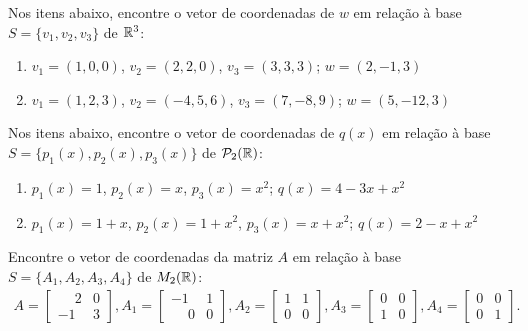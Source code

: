 \documentclass[12pt]{exam}
\begin{document}
    \begin{exercicio}
        Nos itens abaixo, encontre o vetor de coordenadas de $w$ em relação à base $S = \{v_1, v_2, v_3\}$ de $\mathbb{R}^3$:
        \begin{enumerate}[label={\alph*})]
            \item $v_1 = (1, 0, 0)$, $v_2 = (2, 2, 0)$, $v_3 = (3, 3, 3)$; $w = (2, -1, 3)$
            \item $v_1 = (1, 2, 3)$, $v_2 = (-4, 5, 6)$, $v_3 = (7, -8, 9)$; $w = (5, -12, 3)$
        \end{enumerate}
    \end{exercicio}

    \begin{exercicio}
        Nos itens abaixo, encontre o vetor de coordenadas de $q(x)$ em relação à base $S = \{p_1(x), p_2(x), p_3(x)\}$ de $\mathcal{P}_2(\mathbb{R})$:
        \begin{enumerate}[label={\alph*})]
            \item $p_1(x) = 1$, $p_2(x) = x$, $p_3(x) = x^2$; $q(x) = 4 - 3x + x^2$
            \item $p_1(x) = 1 + x$, $p_2(x) = 1 + x^2$, $p_3(x) = x + x^2$; $q(x) = 2 - x + x^2$
        \end{enumerate}
    \end{exercicio}

    \begin{exercicio}
        Encontre o vetor de coordenadas da matriz $A$ em relação à base $S = \{A_1, A_2, A_3, A_4\}$ de $M_2(\mathbb{R})$:
        \begin{align*}
            A = \begin{bmatrix}
                \phantom{-} 2 & 0\\
                -1 & 3
            \end{bmatrix},
            A_1 = \begin{bmatrix}
                -1 & 1\\
                \phantom{-} 0 & 0
            \end{bmatrix},
            A_2 = \begin{bmatrix}
                1 & 1\\
                0 & 0
            \end{bmatrix},
            A_3 = \begin{bmatrix}
                0 & 0\\
                1 & 0
            \end{bmatrix},
            A_4 = \begin{bmatrix}
                0 & 0\\
                0 & 1
            \end{bmatrix}.
        \end{align*}
    \end{exercicio}
\end{document}
